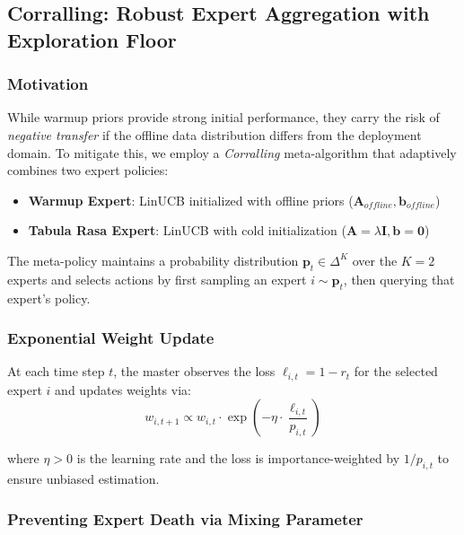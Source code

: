 
\subsection{Corralling: Robust Expert Aggregation with Exploration Floor}
\label{sec:corralling}

\subsubsection{Motivation}
While warmup priors provide strong initial performance, they carry the risk of \textit{negative transfer} if the offline data distribution differs from the deployment domain. To mitigate this, we employ a \textit{Corralling} meta-algorithm \cite{agarwal2017corralling} that adaptively combines two expert policies:

\begin{itemize}
    \item \textbf{Warmup Expert}: LinUCB initialized with offline priors ($\mathbf{A}_{offline}, \mathbf{b}_{offline}$)
    \item \textbf{Tabula Rasa Expert}: LinUCB with cold initialization ($\mathbf{A} = \lambda \mathbf{I}, \mathbf{b} = \mathbf{0}$)
\end{itemize}

The meta-policy maintains a probability distribution $\mathbf{p}_t \in \Delta^K$ over the $K=2$ experts and selects actions by first sampling an expert $i \sim \mathbf{p}_t$, then querying that expert's policy.

\subsubsection{Exponential Weight Update}
At each time step $t$, the master observes the loss $\ell_{i,t} = 1 - r_t$ for the selected expert $i$ and updates weights via:
\begin{equation}
    w_{i,t+1} \propto w_{i,t} \cdot \exp\left(-\eta \cdot \frac{\ell_{i,t}}{p_{i,t}}\right)
\end{equation}

where $\eta > 0$ is the learning rate and the loss is importance-weighted by $1/p_{i,t}$ to ensure unbiased estimation.

\subsubsection{Preventing Expert Death via Mixing Parameter}
\label{sec:expert_death_prevention}

